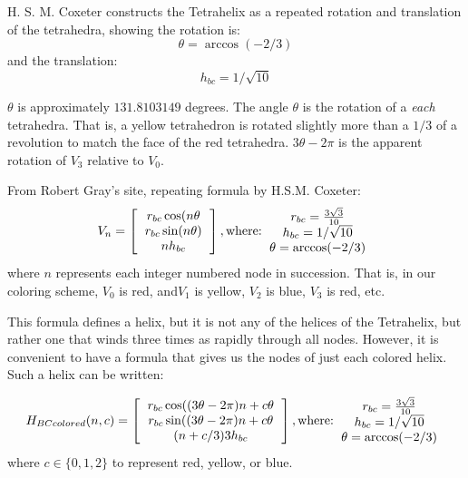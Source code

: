 \documentclass[11pt]{article}
\begin{document}
H. S. M. Coxeter constructs the Tetrahelix as a repeated rotation and translation of the tetrahedra, showing the
rotation is:
\[
\theta = \arccos(-2/3) 
\]
and the translation:
\[
h_{bc} = 1/\sqrt{10}
\]


$\theta$ is approximately $131.8103149$ degrees.
The angle $\theta$ is the rotation of a \emph{each} tetrahedra.
That is, a yellow tetrahedron is rotated slightly more than a $1/3$ of a revolution to match the face of the red tetrahedra.
$3 \theta - 2\pi$ is the apparent rotation of $V_3$ relative to $V_0$.

From Robert Gray's site, repeating formula by H.S.M. Coxeter:
\[
V_n =
\left [
  \begin{tabular}{c}
   $ r_{bc} \cos(n \theta $\\
   $ r_{bc} \sin(n \theta) $\\
   $ n h_{bc}  $
  \end{tabular}
  \right ],
\text{where:}
  \begin{tabular}{c}
 $ r_{bc} = \frac{3\sqrt{3}}{10} $\\
 $ h_{bc} = 1/\sqrt{10} $ \\
 $ \theta = \arccos(-2/3) $ \\
  \end{tabular}      
\]
where $n$ represents each integer numbered node in succession. That is, in our coloring scheme, $V_0$ is red, and$ V_1$ is yellow,  $V_2$ is blue,
$V_3$ is red, etc. 

This formula defines a helix, but it is not any of the helices of the Tetrahelix, but rather one that winds three times
as rapidly through all nodes. However, it is convenient to have a formula that gives us the nodes of just
each colored helix. Such a helix can be written:

\[
H_{BCcolored}(n,c) =
\left [
  \begin{tabular}{c}
   $ r_{bc}  \cos((3 \theta - 2 \pi)n + c  \theta $\\
   $ r_{bc} \sin((3 \theta - 2 \pi)n + c  \theta $\\
   $ (n + c/3) 3  h_{bc} $
  \end{tabular}
  \right ],
\text{where:}
  \begin{tabular}{c}
 $ r_{bc} = \frac{3\sqrt{3}}{10} $\\
 $ h_{bc} = 1/\sqrt{10} $ \\
 $ \theta = \arccos(-2/3) $ \\
  \end{tabular}      
\]
where $c \in \{0,1,2\}$ to represent red, yellow, or blue.
\end{document}
